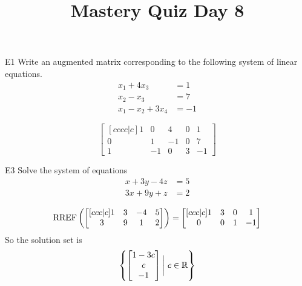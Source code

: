 \documentclass{sbgLAquiz}
\title{Mastery Quiz Day 8 }
\begin{document}
\begin{problem}{E1}
Write an augmented matrix corresponding to the following system of linear equations.
\begin{align*}
x_1+4x_3 &= 1 \\
x_2-x_3 &= 7 \\
x_1-x_2+3x_4 &= -1
\end{align*}
\end{problem}
\begin{solution}
\[
\begin{bmatrix}[cccc|c]
1 & 0 & 4 & 0 & 1 \\
0 & 1 & -1 & 0 & 7 \\
1 & -1 & 0 & 3 & -1
\end{bmatrix}
\]
\end{solution}

\begin{problem}{E3}
Solve the system of equations
\begin{align*}
x+3y-4z &= 5 \\
3x+9y+z &= 2
\end{align*}
\end{problem}
\begin{solution}
$$\operatorname{RREF} \left(\begin{bmatrix}[ccc|c] 1 & 3 & -4 & 5 \\ 3 & 9 & 1 & 2 \end{bmatrix} \right) = \begin{bmatrix}[ccc|c] 1 & 3 & 0 & 1 \\ 0 & 0 & 1 & -1\end{bmatrix}$$
So the solution set is
$$\left\{ \begin{bmatrix} 1-3c \\ c \\ -1 \end{bmatrix} \bigg|\ c \in \mathbb{R} \right\}$$
\end{solution}
\end{document}
